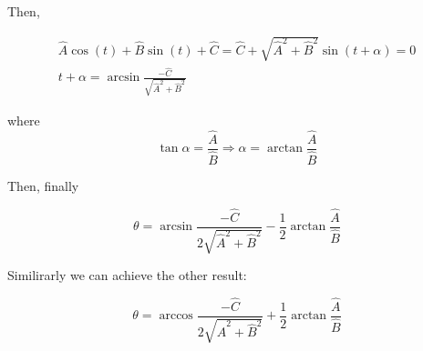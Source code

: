 \documentclass{article}
\begin{document}
Then,

\begin{eqnarray}
\hat{A} \cos{(t)} + \hat{B}\sin{(t)} + \hat{C} = \hat{C} + \sqrt{\hat{A}^2 + \hat{B}^2} \sin{(t+\alpha)} = 0\\
t + \alpha = \arcsin{\frac{-\hat{C}}{\sqrt{\hat{A}^2 + \hat{B}^2}}}
\end{eqnarray}

where $$\tan{\alpha} = \frac{\hat{A}}{\hat{B}} \Rightarrow \alpha = \arctan{\frac{\hat{A}}{\hat{B}}}$$

Then, finally

\begin{equation}
	\theta = \arcsin{\frac{-\hat{C}}{2\sqrt{\hat{A}^2 + \hat{B}^2}}} - \frac{1}{2}\arctan{\frac{\hat{A}}{\hat{B}}}
\end{equation}

Similirarly we can achieve the other result:

\begin{equation}
\theta = \arccos{\frac{-\hat{C}}{2\sqrt{\hat{A}^2 + \hat{B}^2}}} + \frac{1}{2}\arctan{\frac{\hat{A}}{\hat{B}}}
\end{equation}
	
	
\end{document}
